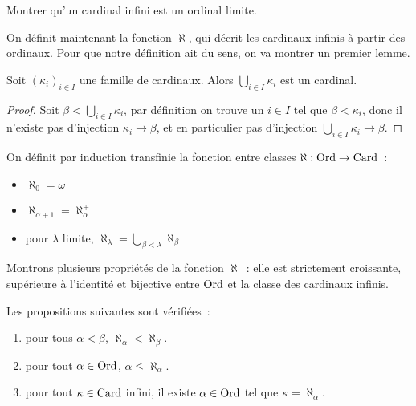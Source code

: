 \begin{exercise}
  Montrer qu'un cardinal infini est un ordinal limite.
\end{exercise}

On définit maintenant la fonction $\aleph$, qui décrit les cardinaux infinis à
partir des ordinaux. Pour que notre définition ait du sens, on va montrer un
premier lemme.

\begin{lemma}
  Soit $(\kappa_i)_{i\in I}$ une famille de cardinaux. Alors
  $\displaystyle\bigcup_{i\in I} \kappa_i$ est un cardinal.
\end{lemma}

\begin{proof}
  Soit $\beta < \bigcup_{i\in I}\kappa_i$, par définition on trouve un
  $i \in I$ tel que $\beta < \kappa_i$, donc il n'existe pas d'injection
  $\kappa_i \to \beta$, et en particulier pas d'injection
  $\bigcup_{i\in I}\kappa_i\to\beta$.
\end{proof}

\begin{definition}
  On définit par induction transfinie la fonction entre classes
  $\aleph : \operatorname{Ord} \to \operatorname{Card}$~:
  \begin{itemize}
  \item $\aleph_0 = \omega$
  \item $\aleph_{\alpha + 1} = \aleph_\alpha^+$
  \item pour $\lambda$ limite,
    $\displaystyle\aleph_\lambda = \bigcup_{\beta < \lambda}\aleph_\beta$
  \end{itemize}
\end{definition}

Montrons plusieurs propriétés de la fonction $\aleph$~: elle est strictement
croissante, supérieure à l'identité et bijective entre $\operatorname{Ord}$ et la classe des
cardinaux infinis.

\begin{property}
  Les propositions suivantes sont vérifiées~:
  \begin{enumerate}[label=(\roman*)]
  \item pour tous $\alpha < \beta$, $\aleph_\alpha < \aleph_\beta$.
  \item pour tout $\alpha \in \operatorname{Ord}$, $\alpha \leq \aleph_\alpha$.
  \item pour tout $\kappa \in \operatorname{Card}$ infini, il existe $\alpha \in \operatorname{Ord}$ tel
    que $\kappa = \aleph_\alpha$.
  \end{enumerate}
\end{property}

